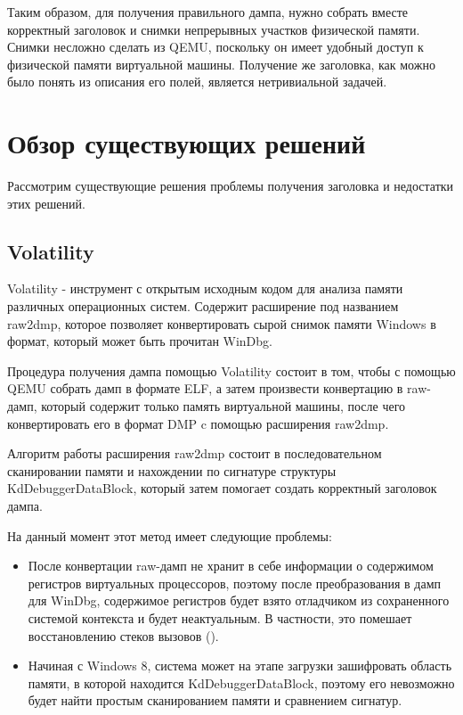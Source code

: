 \documentclass{mipt-thesis-bs}
\begin{document}
Таким образом, для получения правильного дампа, нужно собрать вместе корректный заголовок и снимки непрерывных участков физической памяти. Снимки несложно сделать из QEMU, поскольку он имеет удобный доступ к физической памяти виртуальной машины. Получение же заголовка, как можно было понять из описания его полей, является нетривиальной задачей.

\chapter{Обзор существующих решений}

Рассмотрим существующие решения проблемы получения заголовка и недостатки этих решений.

\section*{Volatility}

Volatility - инструмент с открытым исходным кодом для анализа памяти различных операционных систем. Содержит расширение под названием raw2dmp, которое позволяет конвертировать сырой снимок памяти Windows в формат, который может быть прочитан WinDbg.

Процедура получения дампа помощью Volatility состоит в том, чтобы с помощью QEMU собрать дамп в формате ELF, а затем произвести конвертацию в raw-дамп, который содержит только память виртуальной машины, после чего конвертировать его в формат DMP c помощью расширения raw2dmp\cite{lpblog}.

Алгоритм работы расширения raw2dmp состоит в последовательном сканировании памяти и нахождении по сигнатуре структуры KdDebuggerDataBlock, который затем помогает создать корректный заголовок дампа.

На данный момент этот метод имеет следующие проблемы:

\begin{itemize}
    \item После конвертации raw-дамп не хранит в себе информации о содержимом регистров виртуальных процессоров, поэтому после преобразования в дамп для WinDbg, содержимое регистров будет взято отладчиком из сохраненного системой контекста и будет неактуальным. В частности, это помешает восстановлению стеков вызовов ().
    \item Начиная с Windows 8, система может на этапе загрузки зашифровать область памяти, в которой находится KdDebuggerDataBlock, поэтому его невозможно будет найти простым сканированием памяти и сравнением сигнатур.
\end{itemize}
\end{document}
